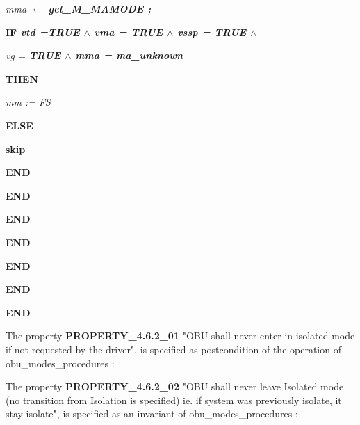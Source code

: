 {\begin{minipage}{14cm}
\hspace*{1.20in}\it mma  $\leftarrow$  \bf get\_M\_MAMODE \rm ;

\hspace*{1.20in}\bf IF \it vtd \rm =\hspace*{0.10in}\bf TRUE  $\land$  \it vma \rm = \bf TRUE  $\land$  \it vssp \rm = \bf TRUE  $\land$ 

\hspace*{1.40in} \it vg \rm = \bf TRUE  $\land$  \it mma \rm = \it ma\_unknown

\hspace*{1.20in}\bf  THEN

\hspace*{1.40in}\it mm \rm := \it FS 

\hspace*{1.20in}\bf  ELSE

\hspace*{1.40in}\bf skip

\hspace*{1.20in}\bf END

\hspace*{1.00in}\bf END

\hspace*{0.80in}\bf END

\hspace*{0.60in}\bf END

\hspace*{0.40in}\bf END

\hspace*{0.20in}\bf END

\vspace*{8mm}
\bf END

\end{minipage}
}


\newpage

The property \textbf{PROPERTY\_4.6.2\_01}  "OBU shall never enter in isolated mode if not requested by the driver", is specified as postcondition of the operation of obu\_modes\_procedures :

	    
	    \vspace*{8mm}
		    
The property \textbf{PROPERTY\_4.6.2\_02}   "OBU shall never leave Isolated mode (no transition from Isolation is specified) ie. if system  was previously  isolate, it stay isolate", is specified as an invariant of obu\_modes\_procedures :

